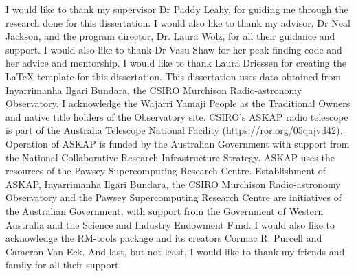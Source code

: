 \documentclass[
11pt, %
english, %
onehalfspacing, %
toctotoc, %
headsepline, %
twoside,
]{MastersDoctoralThesis} %
\begin{document}






\begin{acknowledgements}
\addchaptertocentry{\acknowledgementname} %

I would like to thank my supervisor Dr Paddy Leahy, for guiding me through the research done for this dissertation. I would also like to thank my advisor, Dr Neal Jackson, and the program director, Dr. Laura Wolz, for all their guidance and support. I would also like to thank Dr Vasu Shaw for her peak finding code and her advice and mentorship. I would like to thank Laura Driessen for creating the LaTeX template for this dissertation. 
This dissertation uses data obtained from Inyarrimanha
Ilgari Bundara, the CSIRO Murchison Radio-astronomy Observatory. I acknowledge the Wajarri Yamaji People as the
Traditional Owners and native title holders of the Observatory
site. CSIRO’s ASKAP radio telescope is part of the Australia
Telescope National Facility (https://ror.org/05qajvd42). Operation of ASKAP is funded by the Australian Government
with support from the National Collaborative Research Infrastructure Strategy. ASKAP uses the resources of the Pawsey
Supercomputing Research Centre. Establishment of ASKAP,
Inyarrimanha Ilgari Bundara, the CSIRO Murchison Radio-astronomy Observatory and the Pawsey Supercomputing Research Centre are initiatives of the Australian Government,
with support from the Government of Western Australia and
the Science and Industry Endowment Fund. I would also like to acknowledge the RM-tools package and its creators Cormac R. Purcell and Cameron Van Eck.
And last, but not least, I would like to thank my friends and family for all their support. 
\end{acknowledgements}
\end{document}
